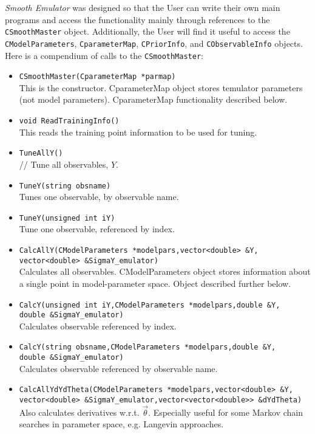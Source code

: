 \documentclass[UserManual.tex]{subfiles}
\begin{document}
{\it Smooth Emulator} was designed so that the User can write their own main programs and access the functionality mainly through references to the {\tt CSmoothMaster} object. Additionally, the User will find it useful to access the {\tt CModelParameters}, {\tt CparameterMap}, {\tt CPriorInfo}, and {\tt CObservableInfo} objects. Here is a compendium of calls to the {\tt CSmoothMaster}:
\begin{itemize}\itemsep=0pt
\item {\tt CSmoothMaster(CparameterMap *parmap)}\\
This is the constructor. CparameterMap object stores temulator parameters (not model parameters). CparameterMap functionality described below.
\item {\tt void ReadTrainingInfo()}\\
This reads the training point information to be used for tuning.
\item {\tt TuneAllY()}\\ //
Tune all observables, $Y$.
\item {\tt TuneY(string obsname)}\\
Tunes one observable, by observable name.
\item {\tt TuneY(unsigned int iY)}\\
Tune one observable, referenced by index.
\item {\tt CalcAllY(CModelParameters *modelpars,vector<double> \&Y,\\vector<double> \&SigmaY\_emulator)}\\
Calculates all observables. CModelParameters object stores information about a single point in model-parameter space. Object described further below.
\item {\tt CalcY(unsigned int iY,CModelParameters *modelpars,double \&Y,\\double \&SigmaY\_emulator)}\\
Calculates observable referenced by index.
\item {\tt CalcY(string obsname,CModelParameters *modelpars,double \&Y,\\double \&SigmaY\_emulator)}\\
Calculates observable referenced by observable name.
\item {\tt CalcAllYdYdTheta(CModelParameters *modelpars,vector<double> \&Y,\\
vector<double> \&SigmaY\_emulator,vector<vector<double>> \&dYdTheta)}\\
Also calculates derivatives w.r.t. $\vec{\theta}$. Especially useful for some Markov chain searches in parameter space, e.g. Langevin approaches.

\end{itemize}
\end{document}
